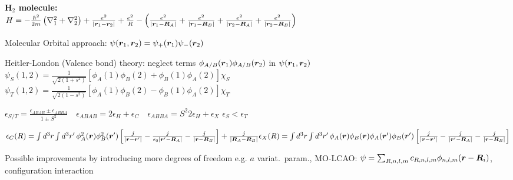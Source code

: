 \begin{squishlist}
    \item \textbf{H$_2$ molecule:} \\
    $H = -\frac{\hbar^2}{2m}\left(\nabla_1^2 + \nabla_2^2\right) + \frac{e^2}{|\vr_1 - \vr_2|} + \frac{e^2}{R} - \left(\frac{e^2}{|\vr_1 - \vR_A|} + \frac{e^2}{|\vr_1 - \vR_B|} + \frac{e^2}{|\vr_2 - \vR_A|} + \frac{e^2}{|\vr_2 - \vR_B|}\right)$
    \item Molecular Orbital approach: $\psi(\vr_1,\vr_2) = \psi_+(\vr_1)\psi_-(\vr_2)$
    
    \item Heitler-London (Valence bond) theory: neglect terms $\phi_{A/B}(\vr_1)\phi_{A/B}(\vr_2)$ in $\psi(\vr_1, \vr_2)$ \\
    $\psi_S(1,2) = \frac{1}{\sqrt{2(1+s^2)}} \left[\phi_A(1)\phi_B(2) + \phi_B(1)\phi_A(2)\right] \chi_S$ \\
    $\psi_T(1,2) = \frac{1}{\sqrt{2(1-s^2)}} \left[\phi_A(1)\phi_B(2) - \phi_B(1)\phi_A(2)\right] \chi_T$
    \item $\epsilon_{S/T} = \frac{\epsilon_{ABAB} \pm \epsilon_{ABBA}}{1 \pm S^2} \quad \epsilon_{ABAB} = 2 \epsilon_H + \epsilon_C \quad \epsilon_{ABBA} = S^2 2 \epsilon_H + \epsilon_{X}$ \squishsep $\epsilon_S < \epsilon_T$
    \item $\epsilon_C(R) = \int d^3r \int d^3r' \, \phi_A^2 (\vec{r}) \phi_B^2 (\vec{r}') \left[ \frac{j}{|\vec{r} - \vec{r}'|}  - \frac{j}{\epsilon_0|\vec{r}' - \vec{R}_A|} - \frac{j}{|\vec{r} - \vec{R}_B|} \right]  + \frac{j}{|\vec{R}_A - \vec{R}_B|}\\
    \epsilon_{X}(R) = \int d^3r \int d^3r' \, \phi_A (\vec{r}) \phi_B (\vec{r}) \phi_A (\vec{r}') \phi_B (\vec{r}')  \left[ \frac{j}{|\vec{r} - \vec{r}'|}  - \frac{j}{|\vec{r}' - \vec{R}_A|}  - \frac{j}{|\vec{r} - \vec{R}_B|} \right]$
    \item Possible improvements by introducing more degrees of freedom e.g. $a$ variat.\ param., MO-LCAO: $\psi = \sum_{R,n,l,m}c_{R,n,l,m} \phi_{n,l,m}(\vr - \vR_i)$, configuration interaction
\end{squishlist}

\squishline


